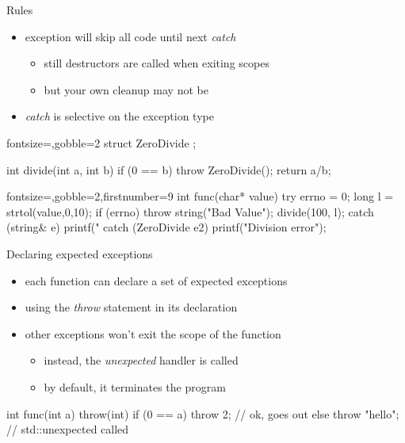 \begin{frame}[fragile]
  \begin{block}{Rules}
    \begin{itemize}
    \item exception will skip all code until next {\it catch}
    \begin{itemize}
      \item still destructors are called when exiting scopes
      \item but your own cleanup may not be
    \end{itemize}
    \item {\it catch} is selective on the exception type
    \end{itemize}
  \end{block}
  \begin{multicols}{2}
    \begin{cppcode*}{fontsize=\scriptsize,gobble=2}
      struct ZeroDivide {};

      int divide(int a, int b) {
        if (0 == b) {
          throw ZeroDivide();
        }
        return a/b;
      }
    \end{cppcode*}
    \columnbreak
    \begin{cppcode*}{fontsize=\scriptsize,gobble=2,firstnumber=9}
      int func(char* value) {
        try {
          errno = 0;
          long l = strtol(value,0,10);
          if (errno) {
            throw string("Bad Value");
          }
          divide(100, l);
        } catch (string& e) {
          printf("%
        } catch (ZeroDivide e2) {
          printf("Division error\n");
        }
      }
    \end{cppcode*}
  \end{multicols}
\end{frame}

\begin{frame}[fragile]
  \begin{block}{Declaring expected exceptions}
    \begin{itemize}
    \item each function can declare a set of expected exceptions
    \item using the {\it throw} statement in its declaration
    \item other exceptions won't exit the scope of the function
      \begin{itemize}
      \item instead, the {\it unexpected} handler is called
      \item by default, it terminates the program
      \end{itemize}
    \end{itemize}
  \end{block}
  \pause
  \begin{cppcode}
    int func(int a) throw(int) {
      if (0 == a) {
        throw 2;  // ok, goes out
      } else {
        throw "hello"; // std::unexpected called
      }
    }
  \end{cppcode}
\end{frame}

